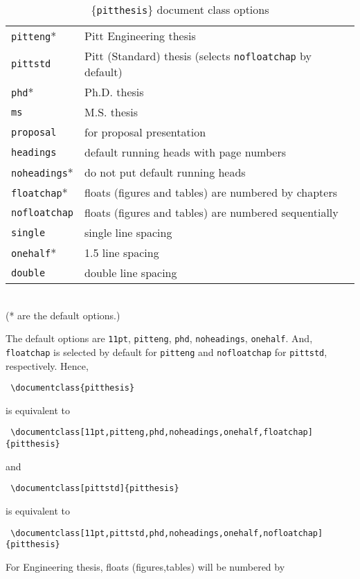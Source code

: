 \begin{table}[b!]
  \centering
  \caption{\{\texttt{pitthesis}\} document class options}
  \label{tab:pitthesis}
  \begin{tabular}{ll}
    \hline
    \verb|pitteng|*   & Pitt Engineering thesis \\
    \verb|pittstd|  & Pitt (Standard) thesis
			(selects \texttt{nofloatchap} by default)\\
    \verb|phd|*       & Ph.D. thesis \\
    \verb|ms|	      & M.S. thesis \\
    \verb|proposal|   & for proposal presentation \\
    \verb|headings|   & default running heads with page numbers \\
    \verb|noheadings|* & do not put default running heads \\
    \verb|floatchap|* & floats (figures and tables) are numbered by chapters \\
    \verb|nofloatchap|& floats (figures and tables) are numbered sequentially\\
    \verb|single|	& single line spacing \\
    \verb|onehalf|*	& 1.5 line spacing \\
    \verb|double|	& double line spacing \\
    \hline
  \end{tabular} \\
  (* are the default options.)
\end{table}
%
The default options are \texttt{11pt}, \texttt{pitteng}, \texttt{phd},
\texttt{noheadings}, \texttt{onehalf}.	And, \texttt{floatchap} is selected
by default for \texttt{pitteng} and \texttt{nofloatchap} for \texttt{pittstd},
respectively.
Hence,
\begin{verbatim}
 \documentclass{pitthesis}
\end{verbatim}
is equivalent to
\begin{verbatim}
 \documentclass[11pt,pitteng,phd,noheadings,onehalf,floatchap]{pitthesis}
\end{verbatim}
and
\begin{verbatim}
 \documentclass[pittstd]{pitthesis}
\end{verbatim}
is equivalent to
\begin{verbatim}
 \documentclass[11pt,pittstd,phd,noheadings,onehalf,nofloatchap]{pitthesis}
\end{verbatim}
For Engineering thesis, floats (figures,tables) will be numbered by
